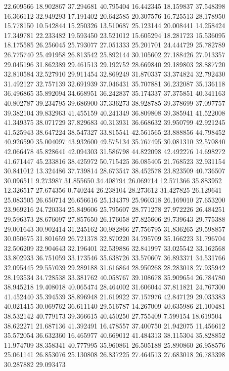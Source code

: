 22.609566
18.902867
37.294681
40.795404
16.442345
18.159837
37.548398
16.366112
32.949293
17.191402
20.642585
20.307576
16.725513
28.178950
15.778150
10.542844
15.250326
13.510687
25.123144
20.008441
14.258424
17.349781
22.233482
19.593450
23.521012
15.605294
18.281723
15.536095
18.175585
26.256045
25.793077
27.051333
25.201701
24.444729
25.782789
26.775740
25.491958
26.813542
25.892144
30.105602
27.188426
27.913357
29.045196
31.862389
29.461513
29.192752
28.669840
29.189803
28.887720
32.810584
32.527910
29.911454
32.869249
31.870337
33.374824
32.792430
31.492127
32.757139
32.691939
37.046431
35.707881
36.232087
35.136118
36.496865
35.892094
34.668951
36.242837
35.174337
37.375851
40.341163
40.802787
39.234795
39.686900
37.336273
38.928785
39.378699
37.097757
39.382104
39.832963
41.455159
40.241349
36.809808
39.385941
41.522008
41.349375
38.071729
37.829683
40.313931
36.668632
39.950799
42.921245
41.525943
38.647224
38.547327
33.815541
42.561565
23.888856
44.798452
40.926590
35.004097
43.932600
49.575134
35.767495
30.081310
32.570840
42.066478
45.828641
42.094303
31.586798
44.822098
42.492276
14.698272
41.671447
45.233816
38.425972
50.715425
36.085405
21.768523
32.931154
30.841012
13.324486
37.739814
28.673547
38.452578
23.823509
40.736507
30.096511
9.273987
31.855650
34.408794
26.069714
12.571366
35.883952
12.326517
27.674356
0.740244
26.238104
28.273612
31.427825
26.129641
25.083505
26.650714
26.656616
25.134379
25.960318
26.169010
27.653200
23.969216
24.720334
25.849606
25.795607
28.771278
27.972226
26.484251
29.596373
28.676097
27.857650
26.176058
27.825606
29.739643
29.775388
29.001643
30.902414
31.245162
30.982866
27.756795
31.836265
29.598857
30.050675
31.801659
26.721378
32.870220
34.795709
35.166223
31.796704
32.506209
32.904643
32.196401
32.539886
32.841997
33.025542
33.162568
33.802933
36.751059
33.173546
35.638726
33.570607
36.893371
34.531766
32.095445
29.557039
29.289188
31.616864
28.950268
28.283018
27.935942
28.193534
34.728538
33.381762
40.058767
39.108678
35.909654
26.784780
38.945218
19.408018
40.065474
28.464002
31.606044
37.811821
24.767300
41.452440
35.394539
38.896948
21.619922
37.157976
42.847129
29.033383
40.021415
30.069762
36.611140
29.516787
14.267009
40.635986
21.100481
38.532142
40.779173
39.366615
40.450250
27.755409
7.599154
18.619504
38.622271
21.687136
41.392491
16.478557
37.400750
21.942075
11.456612
35.572054
36.632360
16.465977
40.669012
41.484313
38.115304
35.828852
11.974709
38.358341
40.777995
35.960861
26.505188
25.890860
26.958576
25.061141
26.853076
25.130808
26.837225
27.464513
27.683018
26.783398
30.287882
29.093473
